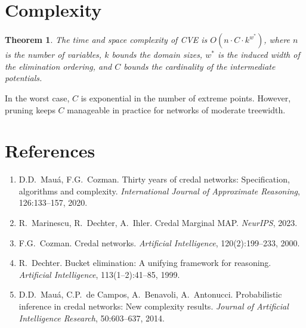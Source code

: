 \documentclass[11pt]{article}
\newtheorem{theorem}{Theorem}
\theoremstyle{definition}
\begin{document}
\section{Complexity}

\begin{theorem}
The time and space complexity of CVE is $O(n \cdot C \cdot k^{w^*})$, where $n$ is
the number of variables, $k$ bounds the domain sizes, $w^*$ is the induced width of the
elimination ordering, and $C$ bounds the cardinality of the intermediate potentials.
\end{theorem}

In the worst case, $C$ is exponential in the number of extreme points. However, pruning
keeps $C$ manageable in practice for networks of moderate treewidth.

\section{References}

\begin{enumerate}
\item D.D.\ Mau\'a, F.G.\ Cozman. Thirty years of credal networks: Specification,
      algorithms and complexity. \emph{International Journal of Approximate Reasoning},
      126:133--157, 2020.
\item R.\ Marinescu, R.\ Dechter, A.\ Ihler. Credal Marginal MAP. \emph{NeurIPS}, 2023.
\item F.G.\ Cozman. Credal networks. \emph{Artificial Intelligence}, 120(2):199--233, 2000.
\item R.\ Dechter. Bucket elimination: A unifying framework for reasoning.
      \emph{Artificial Intelligence}, 113(1--2):41--85, 1999.
\item D.D.\ Mau\'a, C.P.\ de Campos, A.\ Benavoli, A.\ Antonucci. Probabilistic
      inference in credal networks: New complexity results. \emph{Journal of
      Artificial Intelligence Research}, 50:603--637, 2014.
\end{enumerate}
\end{document}
